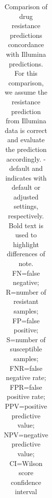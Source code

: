 \begin{table}
{\begin{tabular}{@{}llllllll@{}}
\end{tabular}%
}
\caption{Comparison of \ont{} drug resistance predictions concordance with Illumina predictions. For this comparison, we assume the \mykrobe{} resistance prediction from Illumina data is correct and evaluate the \ont{} prediction accordingly. \mykrobe{}-default and \mykrobe{} indicates \mykrobe{} with default or adjusted settings, respectively. Bold text is used to highlight differences of note. FN=false negative; R=number of resistant samples; FP=false positive; S=number of susceptible samples; FNR=false negative rate; FPR=false positive rate; PPV=positive predictive value; NPV=negative predictive value; CI=Wilson score confidence interval}
\label{tab:mykrobe-settings-geno}
\end{table}
